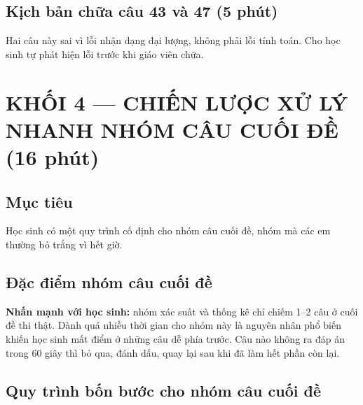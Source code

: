 \documentclass[11pt, a4paper]{article}
\begin{document}
\subsection{Kịch bản chữa câu 43 và 47 (5 phút)}

Hai câu này sai vì lỗi nhận dạng đại lượng, không phải lỗi tính toán. Cho học sinh tự phát hiện lỗi trước khi giáo viên chữa.

\section{KHỐI 4 — CHIẾN LƯỢC XỬ LÝ NHANH NHÓM CÂU CUỐI ĐỀ (16 phút)}

\subsection{Mục tiêu}

Học sinh có một quy trình cố định cho nhóm câu cuối đề, nhóm mà các em thường bỏ trắng vì hết giờ.

\subsection{Đặc điểm nhóm câu cuối đề}


\textbf{Nhấn mạnh với học sinh:} nhóm xác suất và thống kê chỉ chiếm 1–2 câu ở cuối đề thi thật. Dành quá nhiều thời gian cho nhóm này là nguyên nhân phổ biến khiến học sinh mất điểm ở những câu dễ phía trước. Câu nào không ra đáp án trong 60 giây thì bỏ qua, đánh dấu, quay lại sau khi đã làm hết phần còn lại.

\subsection{Quy trình bốn bước cho nhóm câu cuối đề}
\end{document}
